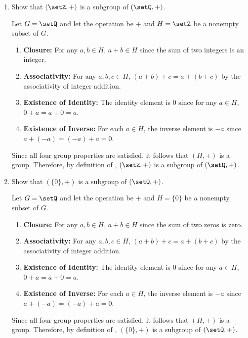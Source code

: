 \begin{enumerate}
  \item Show that \((\setZ, +)\) is a subgroup of \((\setQ, +)\).
  \begin{subprove}
    Let \(G = \setQ\) and let the operation be \(+\) and \(H = \setZ\) be a nonempty subset of \(G\).
    \begin{enumerate}
      \item \textbf{Closure:} For any \(a, b \in H\), \(a + b \in H\) since the sum of two integers is an integer.
      \item \textbf{Associativity:} For any \(a, b, c \in H\), \((a + b) + c = a + (b + c)\) by the associativity of integer addition.
      \item \textbf{Existence of Identity:} The identity element is \(0\) since for any \(a \in H\), \(0 + a = a + 0 = a\).
      \item \textbf{Existence of Inverse:} For each \(a \in H\), the inverse element is \(-a\) since \(a + (-a) = (-a) + a = 0\).
    \end{enumerate}
    Since all four group properties are satisfied, it follows that \((H, +)\) is a group.
    Therefore, by definition of , \((\setZ, +)\) is a subgroup of \((\setQ, +)\).
  \end{subprove}
  \item Show that \((\{0\}, +)\) is a subgroup of \((\setQ, +)\).
  \begin{subprove}
    Let \(G = \setQ\) and let the operation be \(+\) and \(H = \{0\}\) be a nonempty subset of \(G\).
    \begin{enumerate}
      \item \textbf{Closure:} For any \(a, b \in H\), \(a + b \in H\) since the sum of two zeros is zero.
      \item \textbf{Associativity:} For any \(a, b, c \in H\), \((a + b) + c = a + (b + c)\) by the associativity of integer addition.
      \item \textbf{Existence of Identity:} The identity element is \(0\) since for any \(a \in H\), \(0 + a = a + 0 = a\).
      \item \textbf{Existence of Inverse:} For each \(a \in H\), the inverse element is \(-a\) since \(a + (-a) = (-a) + a = 0\).
    \end{enumerate}
    Since all four group properties are satisfied, it follows that \((H, +)\) is a group.
    Therefore, by definition of , \((\{0\}, +)\) is a subgroup of \((\setQ, +)\).
  \end{subprove}
  

\end{enumerate}
